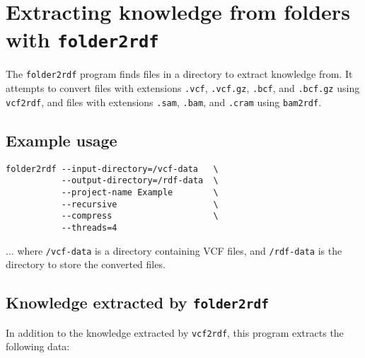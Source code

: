 
\section{Extracting knowledge from folders with \texttt{folder2rdf}}
\label{sec:folder2rdf}

  The \texttt{folder2rdf} program finds files in a directory to extract
  knowledge from.  It attempts to convert files with extensions
  \texttt{.vcf}, \texttt{.vcf.gz}, \texttt{.bcf}, and \texttt{.bcf.gz}
  using \texttt{vcf2rdf}, and files with extensions \texttt{.sam},
  \texttt{.bam}, and \texttt{.cram} using \texttt{bam2rdf}.

\subsection{Example usage}

\begin{siderules}
\begin{verbatim}
folder2rdf --input-directory=/vcf-data   \
           --output-directory=/rdf-data  \
           --project-name Example        \
           --recursive                   \
           --compress                    \
           --threads=4
\end{verbatim}
\end{siderules}

  $\ldots{}$ where \texttt{/vcf-data} is a directory containing VCF files,
  and \texttt{/rdf-data} is the directory to store the converted files.

\subsection{Knowledge extracted by \texttt{folder2rdf}}

  In addition to the knowledge extracted by \texttt{vcf2rdf}, this program
  extracts the following data:

